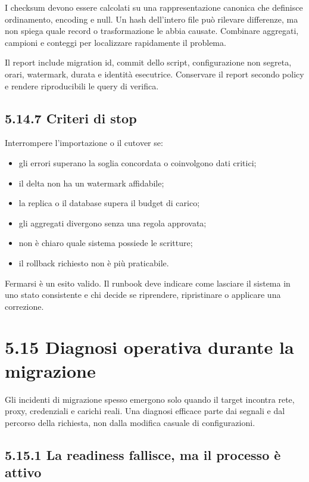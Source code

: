 \documentclass[
  italian,
  10pt,
]{book}
\providecommand{\tightlist}{%
  \setlength{\itemsep}{0pt}\setlength{\parskip}{0pt}}
\begin{document}
I checksum devono essere calcolati su una rappresentazione canonica che
definisce ordinamento, encoding e null. Un hash dell'intero file può
rilevare differenze, ma non spiega quale record o trasformazione le
abbia causate. Combinare aggregati, campioni e conteggi per localizzare
rapidamente il problema.

Il report include migration id, commit dello script, configurazione non
segreta, orari, watermark, durata e identità esecutrice. Conservare il
report secondo policy e rendere riproducibili le query di verifica.

\subsection{5.14.7 Criteri di stop}\label{criteri-di-stop}

Interrompere l'importazione o il cutover se:

\begin{itemize}
\tightlist
\item
  gli errori superano la soglia concordata o coinvolgono dati critici;
\item
  il delta non ha un watermark affidabile;
\item
  la replica o il database supera il budget di carico;
\item
  gli aggregati divergono senza una regola approvata;
\item
  non è chiaro quale sistema possiede le scritture;
\item
  il rollback richiesto non è più praticabile.
\end{itemize}

Fermarsi è un esito valido. Il runbook deve indicare come lasciare il
sistema in uno stato consistente e chi decide se riprendere,
ripristinare o applicare una correzione.

\section{5.15 Diagnosi operativa durante la
migrazione}\label{diagnosi-operativa-durante-la-migrazione}

Gli incidenti di migrazione spesso emergono solo quando il target
incontra rete, proxy, credenziali e carichi reali. Una diagnosi efficace
parte dai segnali e dal percorso della richiesta, non dalla modifica
casuale di configurazioni.

\subsection{5.15.1 La readiness fallisce, ma il processo è
attivo}\label{la-readiness-fallisce-ma-il-processo-uxe8-attivo}
\end{document}
